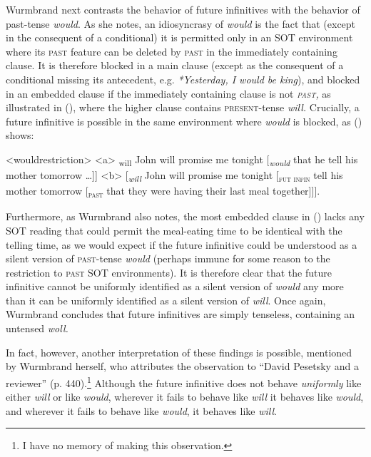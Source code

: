 \documentclass[output=paper]{langscibook}
\begin{document}
Wurmbrand next contrasts the behavior of future infinitives with the behavior of past-tense \textit{would}. As she notes, an idiosyncrasy of \textit{would }is the fact that (except in the consequent of a conditional) it is permitted only in an SOT environment where its \textsc{past} feature can be deleted by \textsc{past} in the immediately containing clause. It is therefore blocked in a main clause (except as the consequent of a conditional missing its antecedent, e.g.\textit{ {*}Yesterday, I would be king}), and blocked in an embedded clause if the immediately containing clause is not\textit{ }\textit{\textsc{past}}\textit{, }as illustrated in (), where the higher clause contains \textsc{present}-tense \textit{will. }Crucially, a future infinitive is possible in the same environment where \textit{would} is blocked, as () shows: 

\noindent \noindent \pex<wouldrestriction>
\a<a> \ljudge{*}{[}\textsubscript{\textnormal{will}} John will promise me tonight {[}\textsubscript{\textit{would}} that he  tell his mother tomorrow \ldots {]]}
\a<b> {[}\textsubscript{\textit{will}} John will promise me tonight {[}\textsubscript{\textsc{fut infin}}  tell his mother tomorrow {[}\textsubscript{\textsc{past}} that they were having their last meal together{]]]}.
\xe

\noindent Furthermore, as Wurmbrand also notes, the most embedded clause in (\noindent {}) lacks any SOT reading that could permit the meal-eating time to be identical with the telling time, as we would expect if the future infinitive could be understood as a silent version of \textsc{past}-tense \textit{would} (perhaps immune for some reason to the restriction to \textsc{past} SOT environments). It is therefore clear that the future infinitive cannot be uniformly identified as a silent version of \textit{would }any more than it can be uniformly identified as a silent version of \textit{will}. Once again, Wurmbrand concludes that future infinitives are simply tenseless, containing an untensed \textit{woll. }

In fact, however, another interpretation of these findings is possible, mentioned by Wurmbrand herself, who attributes the observation to “David Pesetsky and a reviewer” (p. 440).\footnote{I have no memory of making this observation.} Although the future infinitive does not behave \textit{uniformly} like either \textit{will} or like \textit{would}, wherever it fails to behave like \textit{will} it behaves like \textit{would}, and wherever it fails to behave like \textit{would}, it behaves like \textit{will}. 
\end{document}
